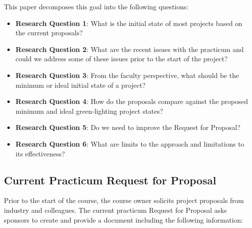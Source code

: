 \documentclass[conference]{IEEEtran}
\begin{document}
This paper decomposes this goal into the following questions:


\begin{itemize}
\itemsep1pt\parskip0pt
\item
  \textbf{Research Question 1}: What is the initial state of most projects
  based on the current proposals?
\item
  \textbf{Research Question 2}: What are the recent issues with the practicum
  and could we address some of these issues prior to the start of the
  project?
\item
  \textbf{Research Question 3}: From the faculty perspective, what should be
  the minimum or ideal initial state of a project?
\item
  \textbf{Research Question 4}: How do the proposals compare against the
  proposed minimum and ideal green-lighting project states?
\item
  \textbf{Research Question 5}: Do we need to improve the Request for
  Proposal?
\item
  \textbf{Research Question 6}: What are limits to the approach and
  limitations to its effectiveness?
\end{itemize}


\subsection{Current Practicum Request for Proposal}
\label{ProposalQuestions}

Prior to the start of the course, the course owner solicits project
proposals from industry and colleagues. The current practicum Request
for Proposal asks sponsors to create and provide a document including
the following information:
\end{document}
